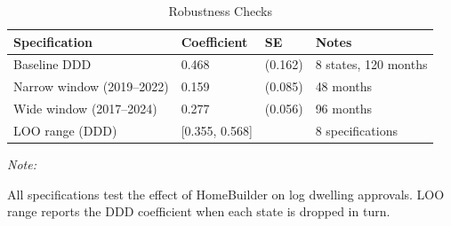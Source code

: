 \begin{table}[!h]
\centering
\caption{\label{tab:robust}Robustness Checks}
\centering
\begin{threeparttable}
\small
\begin{tabular}[t]{llll}
\toprule
Specification & Coefficient & SE & Notes\\
\midrule
Baseline DDD & 0.468 & (0.162) & 8 states, 120 months\\
Narrow window (2019--2022) & 0.159 & (0.085) & 48 months\\
Wide window (2017--2024) & 0.277 & (0.056) & 96 months\\
LOO range (DDD) & {}[0.355, 0.568] &  & 8 specifications\\
\bottomrule
\end{tabular}
\begin{tablenotes}
\item \textit{Note: } 
\item All specifications test the effect of HomeBuilder on log dwelling approvals. LOO range reports the DDD coefficient when each state is dropped in turn.
\end{tablenotes}
\end{threeparttable}
\end{table}
